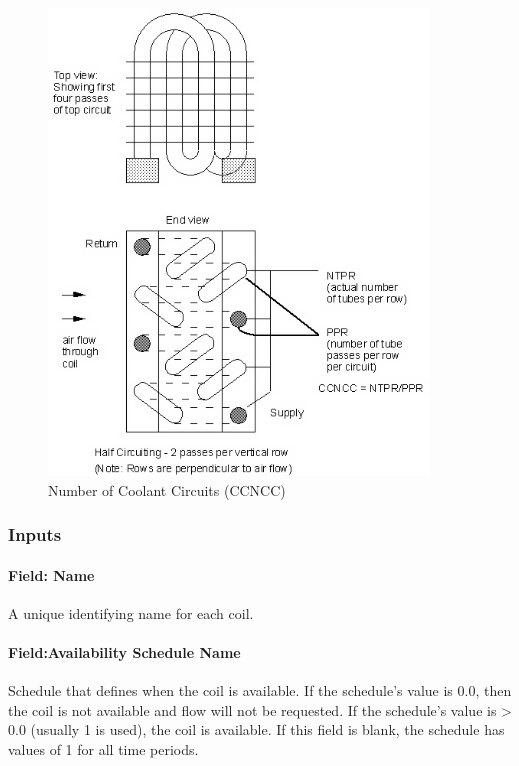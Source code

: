 \begin{figure}[hbtp] %
\centering
\includegraphics[width=0.9\textwidth, height=0.9\textheight, keepaspectratio=true]{media/image354.png}
\caption{Number of Coolant Circuits (CCNCC) \protect \label{fig:number-of-coolant-circuits-ccncc}}
\end{figure}

\subsubsection{Inputs}\label{inputs-12-005}

\paragraph{Field: Name}\label{field-name-11-004}

A unique identifying name for each coil.

\paragraph{Field:Availability Schedule Name}\label{fieldavailability-schedule-name-5}

Schedule that defines when the coil is available. If the schedule's value is 0.0, then the coil is not available and flow will not be requested. If the schedule's value is \textgreater{} 0.0 (usually 1 is used), the coil is available. If this field is blank, the schedule has values of 1 for all time periods.

